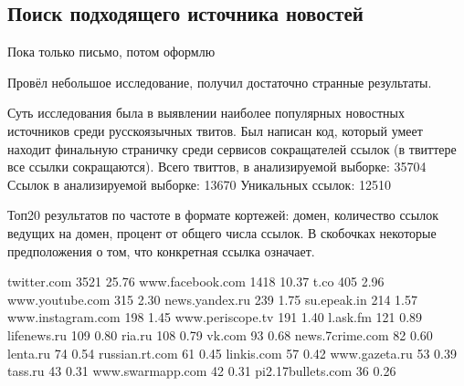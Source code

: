     \subsection{Поиск подходящего источника новостей}
        Пока только письмо, потом оформлю

        Провёл небольшое исследование, получил достаточно странные результаты.

        Суть исследования была в выявлении наиболее популярных новостных источников среди русскоязычных твитов.
        Был написан код, который умеет находит финальную страничку среди сервисов сокращателей ссылок (в твиттере все ссылки сокращаются).
        Всего твиттов, в анализируемой выборке: 35704
        Ссылок в анализируемой выборке: 13670
        Уникальных ссылок: 12510

        Топ20 результатов по частоте в формате кортежей: домен, количество ссылок ведущих на домен, процент от общего числа ссылок. В скобочках некоторые предположения о том, что конкретная ссылка означает.
        
        twitter.com 3521 25.76%
        www.facebook.com 1418 10.37%
        t.co 405 2.96%
        www.youtube.com 315 2.30%
        news.yandex.ru 239 1.75%
        su.epeak.in 214 1.57%
        www.instagram.com 198 1.45%
        www.periscope.tv 191 1.40%
        l.ask.fm 121 0.89%
        lifenews.ru 109 0.80%
        ria.ru 108 0.79%
        vk.com 93 0.68%
        news.7crime.com 82 0.60%
        lenta.ru 74 0.54%
        russian.rt.com 61 0.45%
        linkis.com 57 0.42%
        www.gazeta.ru 53 0.39%
        tass.ru 43 0.31%
        www.swarmapp.com 42 0.31%
        pi2.17bullets.com 36 0.26%
        

